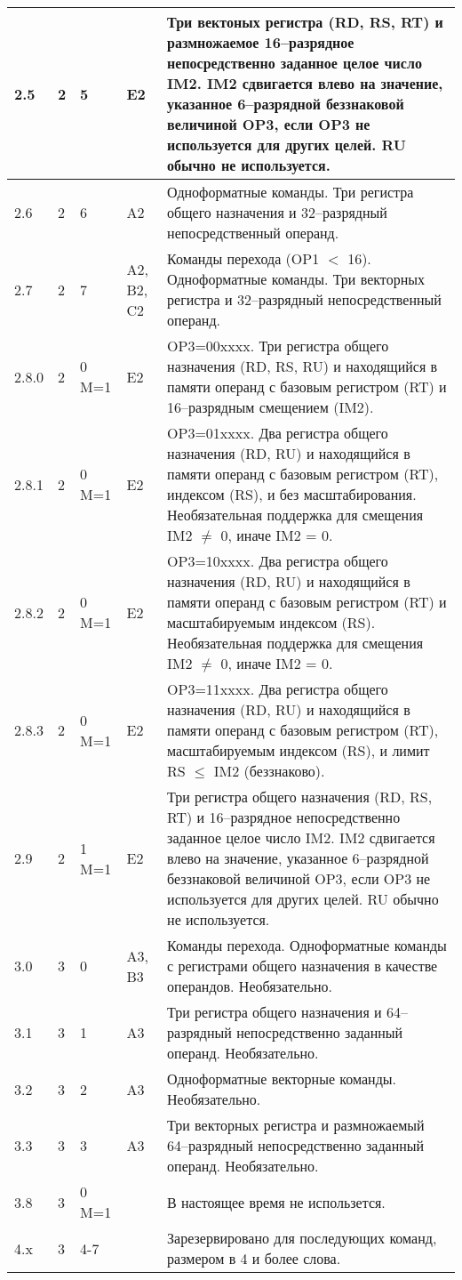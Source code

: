 \documentclass[forwardcom.tex]{subfiles}
\begin{document}
\begin{longtable} {|p{15mm}|p{9mm}|p{9mm}|p{13mm}|p{95mm}|}
2.5 & 2 & 5 & E2 & Три вектоных регистра (RD, RS, RT) и размножаемое 16--разрядное непосредственно заданное целое число IM2. IM2 сдвигается влево на значение, указанное 6--разрядной беззнаковой величиной OP3, если OP3 не используется для других целей. RU обычно не используется. \\ \hline
2.6 & 2 & 6 & A2 & Одноформатные команды. Три регистра общего назначения и 32--разрядный непосредственный операнд. \\ \hline
2.7 & 2 & 7 & A2, B2, C2 & Команды перехода (OP1 $<$ 16). Одноформатные команды. Три векторных регистра и 32--разрядный непосредственный операнд. \\ \hline
2.8.0 & 2 & 0 M=1 & E2 & OP3=00xxxx. Три регистра общего назначения (RD, RS, RU) и находящийся в памяти операнд с базовым регистром (RT) и 16--разрядным смещением (IM2).  \\ \hline
2.8.1 & 2 & 0 M=1 & E2 & OP3=01xxxx. Два регистра общего назначения (RD, RU) и находящийся в памяти операнд с базовым регистром (RT), индексом (RS), и без масштабирования. Необязательная поддержка для смещения IM2 $\neq$ 0, иначе IM2 = 0. \\ \hline
2.8.2 & 2 & 0 M=1 & E2 & OP3=10xxxx. Два регистра общего назначения (RD, RU) и находящийся в памяти операнд с базовым регистром (RT) и масштабируемым индексом (RS). Необязательная поддержка для смещения IM2 $\neq$ 0, иначе IM2 = 0. \\ \hline
2.8.3 & 2 & 0 M=1 & E2 & OP3=11xxxx. Два регистра общего назначения (RD, RU) и находящийся в памяти операнд с базовым регистром (RT), масштабируемым индексом (RS), и лимит RS $\leq$ IM2 (беззнаково). \\ \hline
2.9 & 2 & 1 M=1 & E2 & Три регистра общего назначения (RD, RS, RT) и 16--разрядное непосредственно заданное целое число IM2. IM2 сдвигается влево на значение, указанное 6--разрядной беззнаковой величиной OP3, если OP3 не используется для других целей. RU обычно не используется. \\ \hline
3.0 & 3 & 0 & A3, B3 & Команды перехода. Одноформатные команды с регистрами общего назначения в качестве операндов. Необязательно. \\ \hline
3.1 & 3 & 1 & A3 & Три регистра общего назначения и 64--разрядный непосредственно заданный операнд. Необязательно.  \\ \hline
3.2 & 3 & 2 & A3 & Одноформатные векторные команды. Необязательно. \\ \hline
3.3 & 3 & 3 & A3 & Три векторных регистра и размножаемый 64--разрядный непосредственно заданный операнд. Необязательно. \\ \hline
3.8 & 3 & 0 M=1 & & В настоящее время не использется. \\ \hline
4.x & 3 & 4-7 &  & Зарезервировано для последующих команд, размером в 4 и более слова. \\ \hline
\end{longtable}
\end{document}
